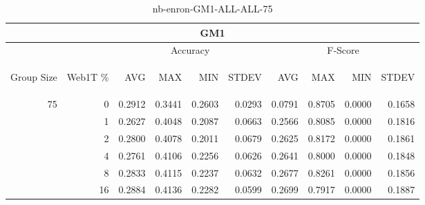 \begin{center}
\begin{table}[htbp]
\begin{tabular}{ | r | r | r | r | r | r | r | r | r | r |}
\hline
\multicolumn{10}{|c|}{GM1}\\
\hline
 & & \multicolumn{4}{|c|}{Accuracy} & \multicolumn{4}{|c|}{F-Score}\\ \cline{3-10}
\begin{sideways}Group Size\end{sideways} & \begin{sideways}Web1T \%\end{sideways} & \begin{sideways}AVG\end{sideways} & \begin{sideways}MAX\end{sideways} & \begin{sideways}MIN\end{sideways} & \begin{sideways}STDEV\end{sideways} & \begin{sideways}AVG\end{sideways} & \begin{sideways}MAX\end{sideways} & \begin{sideways}MIN\end{sideways} & \begin{sideways}STDEV\end{sideways}\\
\hline
\multirow{6}{*}{75}
 & 0 & 0.2912 & 0.3441 & 0.2603 & 0.0293 & 0.0791 & 0.8705 & 0.0000 & 0.1658\\ \cline{2-10}
 & 1 & 0.2627 & 0.4048 & 0.2087 & 0.0663 & 0.2566 & 0.8085 & 0.0000 & 0.1816\\ \cline{2-10}
 & 2 & 0.2800 & 0.4078 & 0.2011 & 0.0679 & 0.2625 & 0.8172 & 0.0000 & 0.1861\\ \cline{2-10}
 & 4 & 0.2761 & 0.4106 & 0.2256 & 0.0626 & 0.2641 & 0.8000 & 0.0000 & 0.1848\\ \cline{2-10}
 & 8 & 0.2833 & 0.4115 & 0.2237 & 0.0632 & 0.2677 & 0.8261 & 0.0000 & 0.1856\\ \cline{2-10}
 & 16 & 0.2884 & 0.4136 & 0.2282 & 0.0599 & 0.2699 & 0.7917 & 0.0000 & 0.1887\\ \cline{2-10}
\hline
\end{tabular}
\caption{nb-enron-GM1-ALL-ALL-75}
\end{table}
\end{center}

